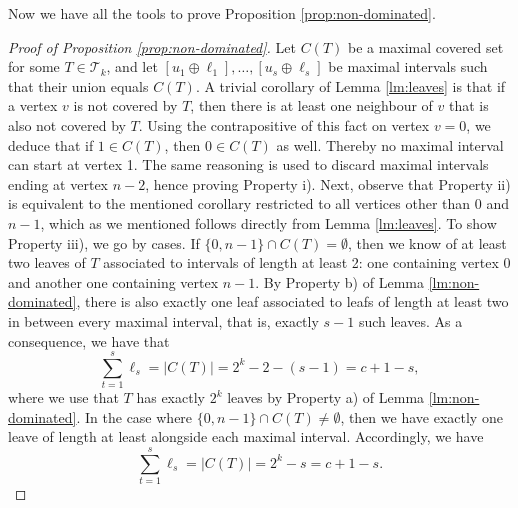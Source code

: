 \documentclass[11pt]{article}
\newcommand{\BSTs}{\mathcal{T}}
\newcommand\+{\mkern2mu}
\begin{document}
Now we have all the tools to prove Proposition \ref{prop:non-dominated}.
\begin{proof}[Proof of Proposition \ref{prop:non-dominated}]
    Let $C(T)$ be a maximal covered set for some $T \in \BSTs_k$, and let $[u_1 \oplus \ell_1], \ldots , [u_s \oplus \ell_s]$ be maximal intervals such that their union equals $C(T)$. A trivial corollary of Lemma \ref{lm:leaves} is that if a vertex $v$ is not covered by $T$, then there is at least one neighbour of $v$ that is also not covered by $T$. Using the contrapositive of this fact on vertex $v=0$, we deduce that if $1 \in C(T)$, then $0 \in C(T)$ as well. Thereby no maximal interval can start at vertex 1. The same reasoning is used to discard maximal intervals ending at vertex $n-2$, hence proving Property i). Next, observe that Property ii) is equivalent to the mentioned corollary restricted to all vertices other than $0$ and $n-1$, which as we mentioned follows directly from Lemma \ref{lm:leaves}. To show Property iii), we go by cases. If $\{0, n-1\} \cap C(T) = \emptyset$, then we know of at least two leaves of $T$ associated to intervals of length at least 2: one containing vertex 0 and another one containing vertex $n-1$. By Property b) of Lemma \ref{lm:non-dominated}, there is also exactly one leaf associated to leafs of length at least two in between every maximal interval, that is, exactly $s-1$ such leaves. As a consequence, we have that
    $$
        \sum_{t=1}^s \ell_s = |C(T)| = 2^k - 2 - (s - 1) = c+1-s,
    $$
    where we use that $T$ has exactly $2^k$ leaves by Property a) of Lemma \ref{lm:non-dominated}. In the case where $\{0, n-1\} \cap C(T) \neq \emptyset$, then we have exactly one leave of length at least  alongside each maximal interval. Accordingly, we have
    $$
        \sum_{t=1}^s \ell_s = |C(T)| = 2^k - s = c+1-s.
    $$


\end{proof}
\end{document}
